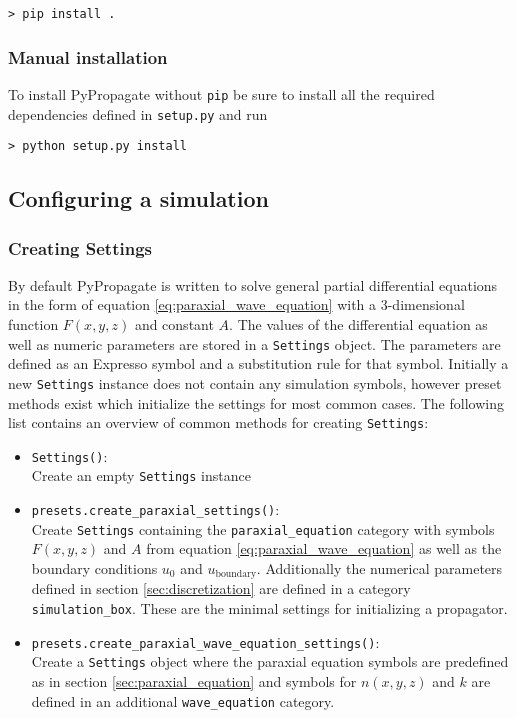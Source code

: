 \begin{lstlisting}
> pip install .
\end{lstlisting}

\subsubsection{Manual installation}

To install PyPropagate without \lstinline{pip} be sure to install all the required dependencies defined in \lstinline{setup.py} and run

\begin{lstlisting}
> python setup.py install
\end{lstlisting}

\subsection{Configuring a simulation}

\subsubsection{Creating Settings}

By default PyPropagate is written to solve general partial differential equations in the form of equation \eqref{eq:paraxial_wave_equation} with a 3-dimensional function $F(x,y,z)$ and constant $A$. The values of the differential equation as well as numeric parameters are stored in a \lstinline{Settings} object. The parameters are defined as an Expresso symbol and a substitution rule for that symbol. Initially a new \lstinline{Settings} instance does not contain any simulation symbols, however preset methods exist which initialize the settings for most common cases. The following list contains an overview of common methods for creating \lstinline{Settings}:

\begin{itemize}
    \item \lstinline{Settings()}: \\ 
    Create an empty \lstinline{Settings} instance
    \item \lstinline{presets.create_paraxial_settings()}: \\
    Create \lstinline{Settings} containing the \lstinline{paraxial_equation} category with symbols $F(x,y,z)$ and $A$ from equation \eqref{eq:paraxial_wave_equation} as well as the boundary conditions $u_0$ and $u_\text{boundary}$. Additionally the numerical parameters defined in section \ref{sec:discretization} are defined in a category \lstinline{simulation_box}. These are the minimal settings for initializing a propagator.
    \item \lstinline{presets.create_paraxial_wave_equation_settings()}: \\
    Create a \lstinline{Settings} object where the paraxial equation symbols are predefined as in section \ref{sec:paraxial_equation} and symbols for $n(x,y,z)$ and $k$ are defined in an additional \lstinline{wave_equation} category.
\end{itemize}

